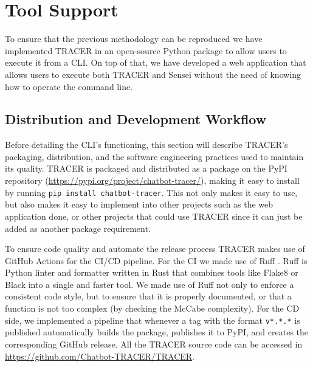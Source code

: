 
\chapter{Tool Support}\label{chapter:tool_support}

To ensure that the previous methodology can be reproduced
we have implemented \acf{TRACER} in an open-source Python package
to allow users to execute it from a \ac{CLI}.
On top of that, we have developed a web application
that allows users to execute both \ac{TRACER} and Sensei
without the need of knowing how to operate the command line.

\section{Distribution and Development Workflow}

Before detailing the \ac{CLI}'s functioning,
this section will describe \ac{TRACER}'s packaging, distribution,
and the software engineering practices used to maintain its quality.
\ac{TRACER} is packaged and distributed as a package on the \acf{PyPI} repository
(\url{https://pypi.org/project/chatbot-tracer/}),
making it easy to install by running
\texttt{pip install chatbot-tracer}.
This not only makes it easy to use,
but also makes it easy to implement into other projects
such as the web application done,
or other projects that could use \ac{TRACER}
since it can just be added as another package requirement.

To ensure code quality and automate the release process
\ac{TRACER} makes use of GitHub Actions for the \ac{CI/CD} pipeline.
For the \ac{CI} we made use of Ruff \autocite{Ruff}.
Ruff is Python linter and formatter written in Rust
that combines tools like Flake8 or Black into a single and faster tool.
We made use of Ruff not only to enforce a consistent code style,
but to ensure that it is properly documented,
or that a function is not too complex (by checking the McCabe complexity).
For the \ac{CD} side,
we implemented a pipeline that whenever a tag with the format \texttt{v*.*.*} is published
automatically builds the package,
publishes it to \ac{PyPI},
and creates the corresponding GitHub release.
All the \ac{TRACER} source code can be accessed in \url{https://github.com/Chatbot-TRACER/TRACER}.
